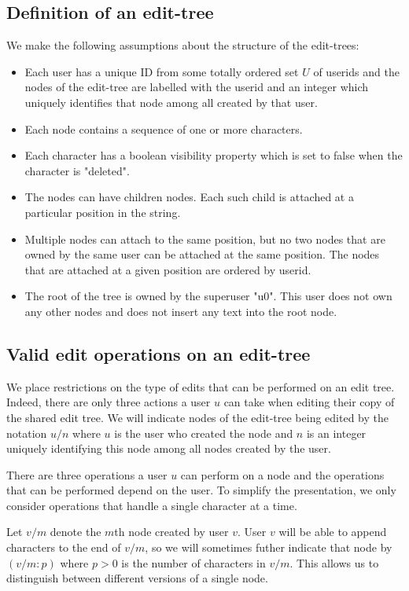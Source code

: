 \documentclass{amsart}
\begin{document}
\subsection{Definition of an edit-tree}
We make the following assumptions about the structure of the edit-trees:
\begin{itemize}
\item Each user has a unique ID from some totally ordered set $U$ of userids 
and the nodes of the edit-tree 
are labelled with the userid and an integer which uniquely identifies
that node among all created by that user.
\item Each node contains a sequence of one or more characters.
\item Each character has a boolean visibility property which is set
to false when the character is "deleted". 
\item The nodes can have children nodes.
Each such child is attached at a particular position in the string.
\item Multiple nodes can attach to the same position, but no two nodes that are owned by the 
same user can be attached at the same position. The nodes that are attached at
a given position are ordered by userid. 
\item The root of the tree is owned by the
superuser "u0". This user does not own any other nodes and does not insert any
text into the root node. 
\end{itemize}

\subsection{Valid edit operations on an edit-tree}
We place restrictions on the type of edits that can be performed
on an edit tree. Indeed, there are only three actions a user $u$ can take
when editing their copy of the shared edit tree. We will indicate nodes 
of the edit-tree being edited by
the notation $u/n$ where $u$ is the user who created the node and $n$ is an
integer uniquely identifying this node among all nodes created by the user.

There are three operations a user $u$ can perform on a node and the operations
that can be performed depend on the user. To simplify the presentation, we only consider operations that handle a single character at a time.

Let $v/m$ denote the $m$th node created by user $v$.
User $v$ will be able to append characters to the end of $v/m$, so 
we will sometimes futher indicate that node by $(v/m:p)$
where $p>0$ is the number of characters in $v/m$. This allows us to
distinguish between different versions of a single node.
\end{document}
